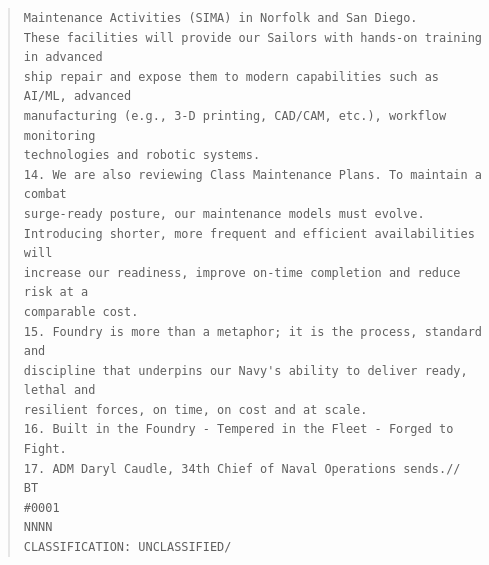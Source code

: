 \documentclass[../main.tex]{subfiles}
\begin{document}
\begin{quote}
\begin{verbatim}
Maintenance Activities (SIMA) in Norfolk and San Diego.
These facilities will provide our Sailors with hands-on training in advanced
ship repair and expose them to modern capabilities such as AI/ML, advanced
manufacturing (e.g., 3-D printing, CAD/CAM, etc.), workflow monitoring
technologies and robotic systems.
14. We are also reviewing Class Maintenance Plans. To maintain a combat
surge-ready posture, our maintenance models must evolve.
Introducing shorter, more frequent and efficient availabilities will
increase our readiness, improve on-time completion and reduce risk at a
comparable cost.
15. Foundry is more than a metaphor; it is the process, standard and
discipline that underpins our Navy's ability to deliver ready, lethal and
resilient forces, on time, on cost and at scale.
16. Built in the Foundry - Tempered in the Fleet - Forged to Fight.
17. ADM Daryl Caudle, 34th Chief of Naval Operations sends.//
BT
#0001
NNNN
CLASSIFICATION: UNCLASSIFIED/
\end{verbatim}
\end{quote}
\end{document}

